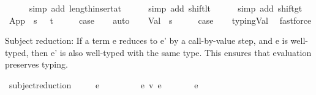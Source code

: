 \begin{isabellebody}
\ \ \ \ \isamarkupfalse%
\ {\isacharparenleft}{\kern0pt}simp\ add{\isacharcolon}{\kern0pt}\ length{\isacharunderscore}{\kern0pt}insert{\isacharunderscore}{\kern0pt}at{\isacharparenright}{\kern0pt}\isanewline
\ \ \ \ \isamarkupfalse%
\ {\isacharparenleft}{\kern0pt}simp\ add{\isacharcolon}{\kern0pt}\ shift{\isacharunderscore}{\kern0pt}lt{\isacharparenright}{\kern0pt}\isanewline
\ \ \ \ \isamarkupfalse%
\ {\isacharparenleft}{\kern0pt}simp\ add{\isacharcolon}{\kern0pt}\ shift{\isacharunderscore}{\kern0pt}gt{\isacharparenright}{\kern0pt}\isanewline
{}\isamarkupfalse%
\isanewline
\ \ \isamarkupfalse%
\ {\isacharparenleft}{\kern0pt}App\ {\isasymGamma}\ s\ {\isasymtau}\ {\isasymtau}{\isacharprime}{\kern0pt}\ t{\isacharparenright}{\kern0pt}\isanewline
\ \ \isamarkupfalse%
\ \isamarkupfalse%
\ {\isacharquery}{\kern0pt}case\isanewline
\ \ \isamarkupfalse%
\ auto\isanewline
{}\isamarkupfalse%
\isanewline
\ \ \isamarkupfalse%
\ {\isacharparenleft}{\kern0pt}Val\ {\isasymGamma}\ s{\isacharparenright}{\kern0pt}\isanewline
\ \ \isamarkupfalse%
\ \isamarkupfalse%
\ {\isacharquery}{\kern0pt}case\isanewline
\ \ \isamarkupfalse%
\ typing{\isachardot}{\kern0pt}Val\ \isamarkupfalse%
\ fastforce\isanewline
{}\isamarkupfalse%
%
\endisatagproof
{\isafoldproof}%
%
\isadelimproof
%
\endisadelimproof
%
\isadelimdocument
%
\endisadelimdocument
%
\isatagdocument
%
\isamarkuptrue%
%
\endisatagdocument
{\isafolddocument}%
%
\isadelimdocument
%
\endisadelimdocument
%
\begin{isamarkuptext}%
Subject reduction:
  If a term e reduces to e' by a call-by-value step,
  and e is well-typed,
  then e' is also well-typed with the same type.
  This ensures that evaluation preserves typing.%
\end{isamarkuptext}\isamarkuptrue%
\isamarkupfalse%
\ subject{\isacharunderscore}{\kern0pt}reduction{\isacharcolon}{\kern0pt}\isanewline
\ \ \ {\isachardoublequoteopen}{\isasymGamma}\ {\isasymturnstile}\ e\ {\isacharcolon}{\kern0pt}\ {\isasymtau}{\isachardoublequoteclose}\isanewline
\ \ \ \ \ \ \ {\isachardoublequoteopen}e\ {\isasymrightarrow}\isactrlsub v\ e{\isacharprime}{\kern0pt}{\isachardoublequoteclose}\isanewline
\ \ \ \ \ {\isachardoublequoteopen}{\isasymGamma}\ {\isasymturnstile}\ e{\isacharprime}{\kern0pt}\ {\isacharcolon}{\kern0pt}\ {\isasymtau}{\isachardoublequoteclose}\isanewline

\end{isabellebody}

